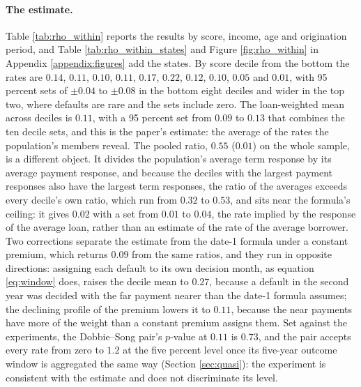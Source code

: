 \paragraph{The estimate.} Table \ref{tab:rho_within} reports the results by score, income, age and origination period, and Table \ref{tab:rho_within_states} and Figure \ref{fig:rho_within} in Appendix \ref{appendix:figures} add the states. By score decile from the bottom the rates are $0.14$, $0.11$, $0.10$, $0.11$, $0.17$, $0.22$, $0.12$, $0.10$, $0.05$ and $0.01$, with 95 percent sets of $\pm 0.04$ to $\pm 0.08$ in the bottom eight deciles and wider in the top two, where defaults are rare and the sets include zero. The loan-weighted mean across deciles is $0.11$, with a 95 percent set from $0.09$ to $0.13$ that combines the ten decile sets, and this is the paper's estimate: the average of the rates the population's members reveal. The pooled ratio, $0.55$ ($0.01$) on the whole sample, is a different object. It divides the population's average term response by its average payment response, and because the deciles with the largest payment responses also have the largest term responses, the ratio of the averages exceeds every decile's own ratio, which run from $0.32$ to $0.53$, and sits near the formula's ceiling: it gives $0.02$ with a set from $0.01$ to $0.04$, the rate implied by the response of the average loan, rather than an estimate of the rate of the average borrower. Two corrections separate the estimate from the date-1 formula under a constant premium, which returns $0.09$ from the same ratios, and they run in opposite directions: assigning each default to its own decision month, as equation \eqref{eq:window} does, raises the decile mean to $0.27$, because a default in the second year was decided with the far payment nearer than the date-1 formula assumes; the declining profile of the premium lowers it to $0.11$, because the near payments have more of the weight than a constant premium assigns them. Set against the experiments, the Dobbie--Song pair's $p$-value at $0.11$ is $0.73$, and the pair accepts every rate from zero to $1.2$ at the five percent level once its five-year outcome window is aggregated the same way (Section \ref{sec:quasi}): the experiment is consistent with the estimate and does not discriminate its level.

